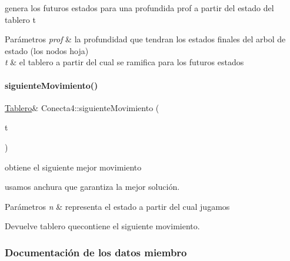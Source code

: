 genera los futuros estados para una profundida prof a partir del estado del tablero t 


\begin{DoxyParams}{Parámetros}
{\em prof} & la profundidad que tendran los estados finales del arbol de estado (los nodos hoja) \\
\hline
{\em t} & el tablero a partir del cual se ramifica para los futuros estados \\
\hline
\end{DoxyParams}
\hypertarget{classConecta4_ae9b5f7cbcb0dbaede77a49137d394c0f}{}\label{classConecta4_ae9b5f7cbcb0dbaede77a49137d394c0f} 
\paragraph{\texorpdfstring{siguiente\+Movimiento()}{siguienteMovimiento()}}
{\footnotesize\ttfamily \hyperlink{classTablero}{Tablero}\& Conecta4\+::siguiente\+Movimiento (\begin{DoxyParamCaption}\item[{\hyperlink{classArbolGeneral}{Arbol\+General}$<$ \hyperlink{classTablero}{Tablero} $>$ \&}]{t }\end{DoxyParamCaption})\hspace{0.3cm}{\ttfamily [private]}}



obtiene el siguiente mejor movimiento 

usamos anchura que garantiza la mejor solución.


\begin{DoxyParams}{Parámetros}
{\em n} & representa el estado a partir del cual jugamos \\
\hline
\end{DoxyParams}
\begin{DoxyReturn}{Devuelve}
tablero quecontiene el siguiente movimiento. 
\end{DoxyReturn}


\subsubsection{Documentación de los datos miembro}
\hypertarget{classConecta4_aabdb9394582c5f280d4a9c4593c53a9b}{}\label{classConecta4_aabdb9394582c5f280d4a9c4593c53a9b} 
